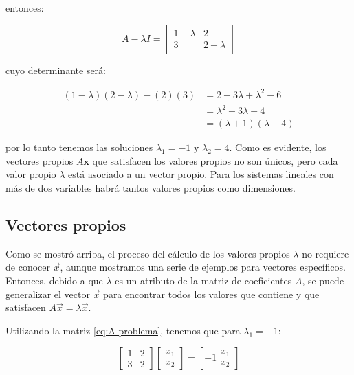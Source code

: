 \documentclass[
]{book}
\begin{document}
entonces:

\begin{equation}
A - \lambda I = \left[
\begin{array}{cc}
1 - \lambda & 2 \\
3 & 2 - \lambda
\end{array}
\right] \label{eq:A-problema}
\end{equation}

cuyo determinante será:

\[\begin{align}
(1 - \lambda)(2-\lambda) - (2)(3) &= 2 - 3 \lambda +\lambda^2 -6\\
& = \lambda^2 - 3 \lambda -4 \\
& = (\lambda + 1)(\lambda - 4)
\end{align}\]

por lo tanto tenemos las soluciones \(\lambda_1 = -1\) y \(\lambda_2 = 4\). Como es evidente, los vectores propios \(A \mathbf{x}\) que satisfacen los valores propios no son únicos, pero cada valor propio \(\lambda\) está asociado a un vector propio. Para los sistemas lineales con más de dos variables habrá tantos valores propios como dimensiones.

\hypertarget{vectores-propios}{%
\subsection{Vectores propios}\label{vectores-propios}}

Como se mostró arriba, el proceso del cálculo de los valores propios \(\lambda\) no requiere de conocer \(\vec{x}\), aunque mostramos una serie de ejemplos para vectores específicos. Entonces, debido a que \(\lambda\) es un atributo de la matriz de coeficientes \(A\), se puede generalizar el vector \(\vec{x}\) para encontrar todos los valores que contiene y que satisfacen \(A \vec{x} = \lambda \vec{x}\).

Utilizando la matriz \eqref{eq:A-problema}, tenemos que para \(\lambda_1 = -1\):

\begin{equation}
\left[
\begin{array}{cc}
1 & 2 \\
3 & 2
\end{array} 
\right]
\left[
\begin{array}{cc}
x_1  \\
x_2
\end{array} 
\right]
=
\left[
-1 \begin{array}{cc}
x_1  \\
x_2
\end{array}
\right]
\end{equation}
\end{document}
